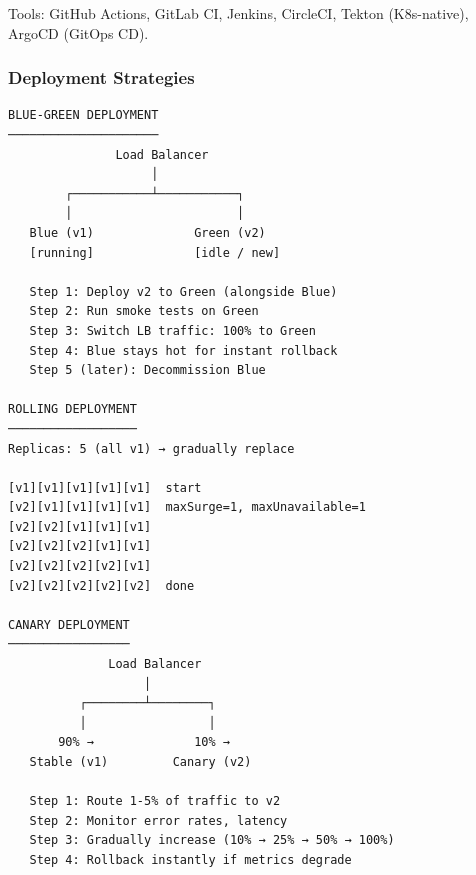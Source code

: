 \documentclass[11pt]{article}
\begin{document}
Tools: GitHub Actions, GitLab CI, Jenkins, CircleCI, Tekton (K8s-native), ArgoCD (GitOps CD).

\subsubsection{Deployment Strategies}\label{deployment-strategies}

\setcodelang{}

\begin{verbatim}
BLUE-GREEN DEPLOYMENT
─────────────────────
               Load Balancer
                    │
        ┌───────────┴───────────┐
        │                       │
   Blue (v1)              Green (v2)
   [running]              [idle / new]
   
   Step 1: Deploy v2 to Green (alongside Blue)
   Step 2: Run smoke tests on Green
   Step 3: Switch LB traffic: 100% to Green
   Step 4: Blue stays hot for instant rollback
   Step 5 (later): Decommission Blue

ROLLING DEPLOYMENT
──────────────────
Replicas: 5 (all v1) → gradually replace

[v1][v1][v1][v1][v1]  start
[v2][v1][v1][v1][v1]  maxSurge=1, maxUnavailable=1
[v2][v2][v1][v1][v1]
[v2][v2][v2][v1][v1]
[v2][v2][v2][v2][v1]
[v2][v2][v2][v2][v2]  done

CANARY DEPLOYMENT
─────────────────
              Load Balancer
                   │
          ┌────────┴────────┐
          │                 │
       90% →              10% →
   Stable (v1)         Canary (v2)
   
   Step 1: Route 1-5% of traffic to v2
   Step 2: Monitor error rates, latency
   Step 3: Gradually increase (10% → 25% → 50% → 100%)
   Step 4: Rollback instantly if metrics degrade
\end{verbatim}
\end{document}
